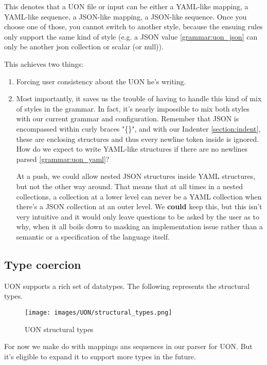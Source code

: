 \documentclass[12pt]{article}
\begin{document}
This denotes that a UON file or input can be either a YAML-like mapping, a YAML-like sequence, a JSON-like mapping, a JSON-like sequence. Once you choose one of those, you cannot switch to another style, because the ensuing rules only support the same kind of style (e.g. a JSON value \ref{grammar:uon_json} can only be another json collection or scalar (or null)).

This achieves two things:
\begin{enumerate}
    \item Forcing user consistency about the UON he's writing.
    \item Most importantly, it saves us the trouble of having to handle this kind of mix of styles in the grammar. In fact, it's nearly impossible to mix both styles with our current grammar and configuration. Remember that JSON is encompassed within curly braces "\{\}", and with our Indenter \ref{section:indent}, these are enclosing structures and thus every newline token inside is ignored. How do we expect to write YAML-like structures if there are no newlines parsed \ref{grammar:uon_yaml}?
    
    At a push, we could allow nested JSON structures inside YAML structures, but not the other way around. That means that at all times in a nested collections, a collection at a lower level can never be a YAML collection when there's a JSON collection at an outer level. We \textbf{could} keep this, but this isn't very intuitive and it would only leave questions to be asked by the user as to why, when it all boils down to masking an implementation issue rather than a semantic or a specification of the language itself.
\end{enumerate}

\pagebreak

\subsection{Type coercion}
UON supports a rich set of datatypes. The following represents the structural types.

\begin{figure}[ht!]
 	\centering
 	\caption{UON structural types}
 	\texttt{[image: images/UON/structural\_types.png]}
 	\label{lab:perceptron}
\end{figure}

For now we make do with mappings ans sequences in our parser for UON. But it's eligible to expand it to support more types in the future.
\end{document}
